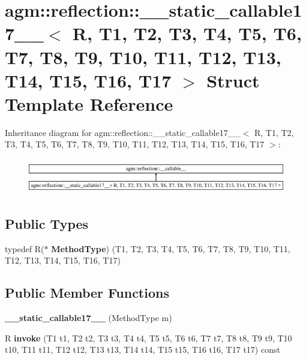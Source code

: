 \hypertarget{structagm_1_1reflection_1_1____static__callable17____}{}\section{agm\+:\+:reflection\+:\+:\+\_\+\+\_\+static\+\_\+callable17\+\_\+\+\_\+$<$ R, T1, T2, T3, T4, T5, T6, T7, T8, T9, T10, T11, T12, T13, T14, T15, T16, T17 $>$ Struct Template Reference}
\label{structagm_1_1reflection_1_1____static__callable17____}
Inheritance diagram for agm\+:\+:reflection\+:\+:\+\_\+\+\_\+static\+\_\+callable17\+\_\+\+\_\+$<$ R, T1, T2, T3, T4, T5, T6, T7, T8, T9, T10, T11, T12, T13, T14, T15, T16, T17 $>$\+:\begin{figure}[H]
\begin{center}
\leavevmode
\includegraphics[height=1.579690cm]{structagm_1_1reflection_1_1____static__callable17____}
\end{center}
\end{figure}
\subsection*{Public Types}
\begin{DoxyCompactItemize}
\item 
typedef R($\ast$ {\bfseries Method\+Type}) (T1, T2, T3, T4, T5, T6, T7, T8, T9, T10, T11, T12, T13, T14, T15, T16, T17)\hypertarget{structagm_1_1reflection_1_1____static__callable17_____aeaa88dfa568182b844f2f02d77fdf65b}{}\label{structagm_1_1reflection_1_1____static__callable17_____aeaa88dfa568182b844f2f02d77fdf65b}

\end{DoxyCompactItemize}
\subsection*{Public Member Functions}
\begin{DoxyCompactItemize}
\item 
{\bfseries \+\_\+\+\_\+static\+\_\+callable17\+\_\+\+\_\+} (Method\+Type m)\hypertarget{structagm_1_1reflection_1_1____static__callable17_____ae3c610ddbabf1889db46685e60b7d191}{}\label{structagm_1_1reflection_1_1____static__callable17_____ae3c610ddbabf1889db46685e60b7d191}

\item 
R {\bfseries invoke} (T1 t1, T2 t2, T3 t3, T4 t4, T5 t5, T6 t6, T7 t7, T8 t8, T9 t9, T10 t10, T11 t11, T12 t12, T13 t13, T14 t14, T15 t15, T16 t16, T17 t17) const \hypertarget{structagm_1_1reflection_1_1____static__callable17_____a55590388ecb80c3939c38f76c22042ce}{}\label{structagm_1_1reflection_1_1____static__callable17_____a55590388ecb80c3939c38f76c22042ce}

\end{DoxyCompactItemize}
